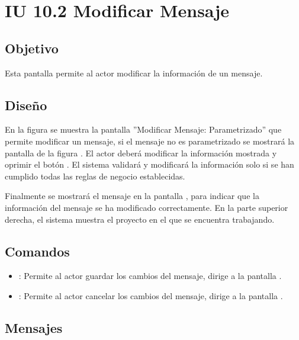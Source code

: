 \section{IU 10.2 Modificar Mensaje}

\subsection{Objetivo}
	Esta pantalla permite al actor modificar la información de un mensaje.
\subsection{Diseño}
	En la figura  se muestra la pantalla ''Modificar Mensaje: Parametrizado'' que permite modificar un mensaje, si el mensaje no es parametrizado se mostrará la pantalla de la figura . El actor deberá modificar la información mostrada y oprimir el botón  . El sistema validará y modificará la información solo si se han cumplido todas las reglas de negocio establecidas.
	
	Finalmente se mostrará el mensaje  en la pantalla , para indicar que la información del mensaje se ha modificado correctamente.
	En la parte superior derecha, el sistema muestra el proyecto en el que se encuentra trabajando.

\subsection{Comandos}
\begin{itemize}
	\item {}: Permite al actor guardar los cambios del mensaje, dirige a la pantalla .
	\item {}: Permite al actor cancelar los cambios del mensaje, dirige a la pantalla .
\end{itemize}

\subsection{Mensajes}

